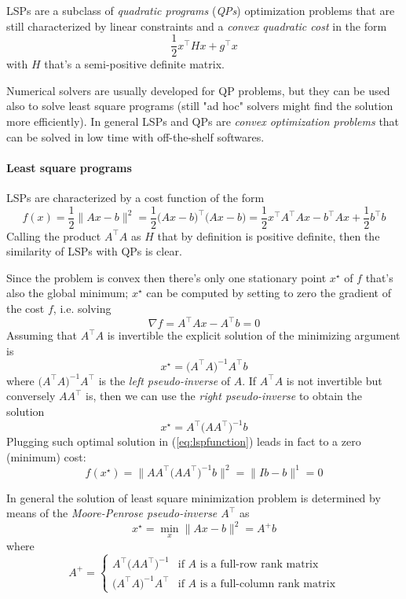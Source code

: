 	LSPs are a subclass of \textit{quadratic programs} (\textit{QPs}) optimization problems that are still characterized by linear constraints and a \textit{convex quadratic cost} in the form
	\[ \frac 1 2 x^\top H x + g^\top x  \]
	with $H$ that's a semi-positive definite matrix.
	
	Numerical solvers are usually developed for QP problems, but they can be used also to solve least square programs (still "ad hoc" solvers might find the solution more efficiently). In general LSPs and QPs are \textit{convex optimization problems} that can be solved in low time with off-the-shelf softwares.
	
	\paragraph{Least square programs} LSPs are characterized by a cost function of the form
	\begin{equation} \label{eq:lspfunction}
		f(x) = \frac 12 \big\|Ax - b\big\|^2 = \frac 1 2 \big(Ax-b\big)^\top\big(Ax -b\big) = \frac 1 2 x^\top A^\top A x - b^\top A x + \frac 1 2 b^\top b 
	\end{equation}
	Calling the product $A^\top A$ as $H$ that by definition is positive definite, then the similarity of LSPs with QPs is clear.
	
	Since the problem is convex then there's only one stationary point $x^\star$ of $f$ that's also the global minimum; $x^\star$ can be computed by setting to zero the gradient of the cost $f$, i.e. solving
	\[ \nabla f = A^\top A x - A^\top b = 0 \]
	Assuming that $A^\top A$ is invertible the explicit solution of the minimizing argument is
	\begin{equation*} \tag{$\dagger$}
		x^\star = \big(A^\top A\big)^{-1} A^\top b
	\end{equation*}
	where $\big(A^\top A\big)^{-1} A^\top$ is the \textit{left pseudo-inverse} of $A$. If $A^\top A$ is not invertible but conversely $AA^\top$ is, then we can use the \textit{right pseudo-inverse} to obtain the solution
	\begin{equation*} \tag{$\ddagger$}
		x^\star = A^\top \big(AA^\top\big)^{-1} b
	\end{equation*}
	Plugging such optimal solution in (\ref{eq:lspfunction}) leads in fact to a zero (minimum) cost:
	\[ f(x^\star) =\big\| AA^\top\big(AA^\top\big)^{-1} b \big\|^2 = \|Ib-b\|^1 = 0 \]
	
	In general the solution of least square minimization problem is determined by means of the \textit{Moore-Penrose pseudo-inverse $A^\top$} as
	\begin{equation} \label{eq:lspsol}
		x^\star = \min_x \big\| Ax - b \big\|^2 = A^+ b
	\end{equation}
	where
	\begin{equation}
		A^+ = \begin{cases}
			A^\top\big(AA^\top\big)^{-1} & \textrm{if $A$ is a full-row rank matrix} \\
			\big(A^\top A\big)^{-1}A^\top & \textrm{if $A$ is a full-column rank matrix} 
		\end{cases}
	\end{equation}
	
